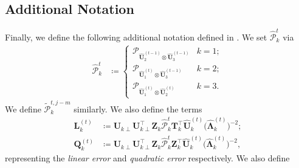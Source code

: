 \documentclass[10pt]{article}
\newcommand{\0}{{\mathbf{0}}}
\newcommand{\1}{{\mathbf{1}}}
\newcommand{\U}{{\mathbf{U}}}
\renewcommand{\citet}{\cite}
\renewcommand{\t}{^{\top}}
\newcommand{\uhat}{\mathbf{\hat{U}}}
\renewcommand{\tilde}{\widetilde}
\renewcommand{\hat}{\widehat}
\renewcommand{\hat}{\widehat}
\begin{document}
 \subsection{Additional Notation} \label{sec:notation2}
 Finally, we define the following additional notation defined in \citet{agterberg_estimating_2022}.  We set $\mathcal{\hat P}_{k}^{t}$ via
 \begin{align*}
     \mathcal{\hat P}_k^{t} &\coloneqq \begin{cases}
     \mathcal{P}_{\uhat_{2}^{(t-1)} \otimes \uhat_3^{(t-1)}} &k = 1; \\
        \mathcal{P}_{\uhat_{1}^{(t)} \otimes \uhat_3^{(t-1)}} &k =2;\\
           \mathcal{P}_{\uhat_{1}^{(t)} \otimes \uhat_2^{(t)}} &k =3. \end{cases}
 \end{align*}
 We define $\mathcal{\tilde P}_k^{t,j-m}$ similarly.  We also define the terms
 \begin{align*}
     \mathbf{L}_k^{(t)} &\coloneqq \U_{k\perp} \U_{k\perp}\t \mathbf{Z}_k \mathcal{\hat P}_k^{t} \mathbf{T}_k\t \uhat_k^{(t)} \big( \mathbf{\hat \Lambda}_k^{(t)}\big)^{-2}; \\
     \mathbf{Q}_k^{(t)} &\coloneqq \U_{k\perp} \U_{k\perp}\t \mathbf{Z}_k \mathcal{\hat P}_k^{t} \mathbf{Z}_k\t \uhat_k^{(t)} \big( \mathbf{\hat \Lambda}_k^{(t)}\big)^{-2},
 \end{align*}
 representing the \emph{linear error} and \emph{quadratic error} respectively.  We also define
\end{document}
